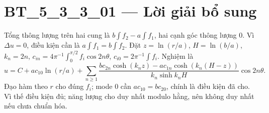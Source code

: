 \documentclass[10pt,a4paper]{article}
\begin{document}
\section*{BT\_5\_3\_3\_01 — Lời giải bổ sung}
Tổng thông lượng trên hai cung là $b\int f_2-a\int f_1$, hai cạnh góc thông lượng 0. Vì $\Delta u=0$, điều kiện cần là $a\int f_1=b\int f_2$. Đặt $z=\ln(r/a)$, $H=\ln(b/a)$, $k_n=2n$, $c_{in}=4\pi^{-1}\int_0^{\pi/2}f_i\cos2n\theta$, $c_{i0}=2\pi^{-1}\int f_i$. Nghiệm là
\[u=C+ac_{10}\ln(r/a)+\sum_{n\ge1}\frac{bc_{2n}\cosh(k_nz)-ac_{1n}\cosh(k_n(H-z))}{k_n\sinh k_nH}\cos2n\theta.\]
Đạo hàm theo $r$ cho đúng $f_i$; mode 0 cần $ac_{10}=bc_{20}$, chính là điều kiện đã cho. Vì thế điều kiện đủ; năng lượng cho duy nhất modulo hằng, nên không duy nhất nếu chưa chuẩn hóa.
\end{document}
